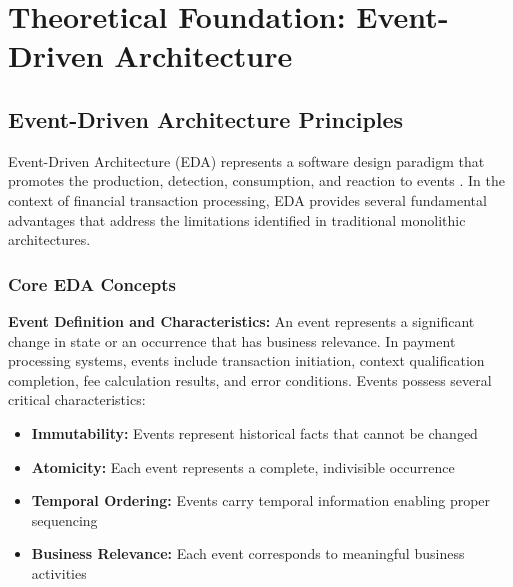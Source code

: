     
    
    




\section{Theoretical Foundation: Event-Driven Architecture}

\subsection{Event-Driven Architecture Principles}

Event-Driven Architecture (EDA) represents a software design paradigm that promotes the production, detection, consumption, and reaction to events \cite{hohpe2003enterprise}. In the context of financial transaction processing, EDA provides several fundamental advantages that address the limitations identified in traditional monolithic architectures.

\subsubsection{Core EDA Concepts}

\textbf{Event Definition and Characteristics:}
An event represents a significant change in state or an occurrence that has business relevance. In payment processing systems, events include transaction initiation, context qualification completion, fee calculation results, and error conditions. Events possess several critical characteristics:

\begin{itemize}
    \item \textbf{Immutability:} Events represent historical facts that cannot be changed
    \item \textbf{Atomicity:} Each event represents a complete, indivisible occurrence
    \item \textbf{Temporal Ordering:} Events carry temporal information enabling proper sequencing
    \item \textbf{Business Relevance:} Each event corresponds to meaningful business activities
\end{itemize}

